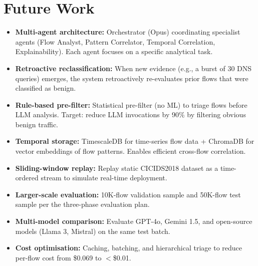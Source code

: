 \documentclass[12pt, a4paper, oneside]{report}
\begin{document}
\chapter{Future Work}
\label{ch:future-notes}

\begin{itemize}[leftmargin=2em]
  \item \textbf{Multi-agent architecture:} Orchestrator (Opus) coordinating
        specialist agents (Flow Analyst, Pattern Correlator, Temporal
        Correlation, Explainability). Each agent focuses on a specific
        analytical task.

  \item \textbf{Retroactive reclassification:} When new evidence (e.g., a
        burst of 30 DNS queries) emerges, the system retroactively re-evaluates
        prior flows that were classified as benign.

  \item \textbf{Rule-based pre-filter:} Statistical pre-filter (no ML) to
        triage flows before LLM analysis. Target: reduce LLM invocations by
        90\% by filtering obvious benign traffic.

  \item \textbf{Temporal storage:} TimescaleDB for time-series flow data +
        ChromaDB for vector embeddings of flow patterns. Enables efficient
        cross-flow correlation.

  \item \textbf{Sliding-window replay:} Replay static CICIDS2018 dataset as a
        time-ordered stream to simulate real-time deployment.

  \item \textbf{Larger-scale evaluation:} 10K-flow validation sample and 50K-flow
        test sample per the three-phase evaluation plan.

  \item \textbf{Multi-model comparison:} Evaluate GPT-4o, Gemini 1.5, and
        open-source models (Llama 3, Mistral) on the same test batch.

  \item \textbf{Cost optimisation:} Caching, batching, and hierarchical triage
        to reduce per-flow cost from \$0.069 to $<$\$0.01.
\end{itemize}


\end{document}
